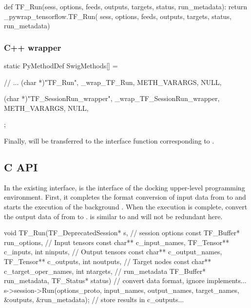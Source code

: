 \begin{content}
\begin{leftbar}
\begin{python}[caption={tensorflow/bazel-bin/tensorflow/python/pywrap\_tensorflow\_internal.py}]
def TF_Run(sess, options, feeds, outputs, 
  targets, status, run_metadata):
  return _pywrap_tensorflow.TF_Run(
    sess, options, feeds, outputs, targets, status, run_metadata)
\end{python}
\end{leftbar}


\subsubsection{C++ wrapper}

\begin{leftbar}
\begin{c++}[caption={tensorflow/bazel-bin/tensorflow/python/pywrap\_tensorflow\_internal.cc}]
static PyMethodDef SwigMethods[] = {
  // ...
  { (char *)"TF_Run", 
    _wrap_TF_Run, METH_VARARGS, NULL},

  { (char *)"TF_SessionRun_wrapper", 
    _wrap_TF_SessionRun_wrapper, METH_VARARGS, NULL},
};
\end{c++}
\end{leftbar}

Finally,  will be transferred to the  interface function corresponding to .


\subsection{C API}
In the existing interface,  is the interface of the  docking upper-level programming environment. First, it completes the format conversion of input data from  to \cpp{} and starts the execution of the background . When the execution is complete, convert the output data of  from \cpp{} to .  is similar to  and will not be redundant here.

\begin{leftbar}
\begin{c++}[caption={tensorflow/c/c\_api.c}]
void TF_Run(TF_DeprecatedSession* s, 
  // session options
  const TF_Buffer* run_options,
  // Input tensors
  const char** c_input_names, TF_Tensor** c_inputs, int ninputs,
  // Output tensors
  const char** c_output_names, TF_Tensor** c_outputs, int noutputs,
  // Target nodes
  const char** c_target_oper_names, int ntargets,
  // run\_metadata
  TF_Buffer* run_metadata, TF_Status* status) {
  // convert data format, ignore implements...
  s->session->Run(options_proto, input_names, output_names,
                  target_names, &outputs, &run_metadata); 
  // store results in c\_outputs...
}


\end{c++}
\end{leftbar}
\end{content}

